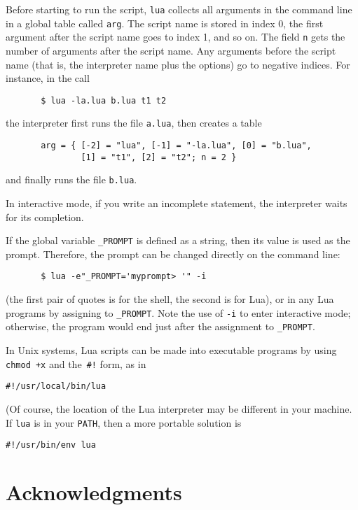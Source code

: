 \documentclass[11pt,twoside]{article}
\makeatletter
\newcommand{\T}[1]{{\tt #1}}
\newcommand{\IndexVerb}[1]{\T{#1}\index{#1@{\tt #1}}}
\makeatother
\begin{document}
Before starting to run the script,
\verb|lua| collects all arguments in the command line
in a global table called \verb|arg|.
The script name is stored in index 0,
the first argument after the script name goes to index 1,
and so on.
The field \verb|n| gets the number of arguments after the script name.
Any arguments before the script name
(that is, the interpreter name plus the options)
go to negative indices.
For instance, in the call
\begin{verbatim}
       $ lua -la.lua b.lua t1 t2
\end{verbatim}
the interpreter first runs the file \T{a.lua},
then creates a table
\begin{verbatim}
       arg = { [-2] = "lua", [-1] = "-la.lua", [0] = "b.lua",
               [1] = "t1", [2] = "t2"; n = 2 }
\end{verbatim}
and finally runs the file \T{b.lua}.

In interactive mode,
if you write an incomplete statement,
the interpreter waits for its completion.

If the global variable \IndexVerb{_PROMPT} is defined as a string,
then its value is used as the prompt.
Therefore, the prompt can be changed directly on the command line:
\begin{verbatim}
       $ lua -e"_PROMPT='myprompt> '" -i
\end{verbatim}
(the first pair of quotes is for the shell,
the second is for Lua),
or in any Lua programs by assigning to \verb|_PROMPT|.
Note the use of \verb|-i| to enter interactive mode; otherwise,
the program would end just after the assignment to \verb|_PROMPT|.

In Unix systems, Lua scripts can be made into executable programs
by using \verb|chmod +x| and the~\verb|#!| form,
as in
\begin{verbatim}
#!/usr/local/bin/lua
\end{verbatim}
(Of course,
the location of the Lua interpreter may be different in your machine.
If \verb|lua| is in your \verb|PATH|,
then a more portable solution is
\begin{verbatim}
#!/usr/bin/env lua
\end{verbatim}


\section*{Acknowledgments}
\end{document}
